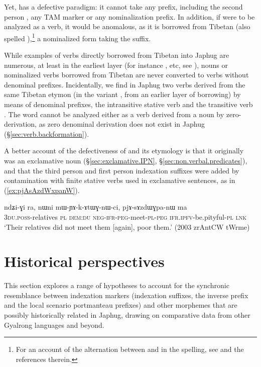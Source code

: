 Yet,  has a defective paradigm: it cannot take any prefix, including the second person , any TAM marker or any nominalization prefix. In addition, if  were to be analyzed as a verb, it would be anomalous, as it is borrowed from Tibetan  (also spelled  ),\footnote{For an account of the alternation between  and  in the spelling, see \citet{hill11hb} and the references therein.} a nominalized form taking the  suffix. 

While examples of verbs directly borrowed from Tibetan into Japhug are numerous, at least in the earliest layer (for instance ,  etc, see \citealt{jacques19contact}), nouns or nominalized verbs borrowed from Tibetan are never converted to verbs without denominal prefixes. Incidentally, we find in Japhug two verbs derived from the same Tibetan etymon (in the variant , from an earlier layer of borrowing) by means of denominal prefixes, the intransitive stative verb  and the transitive verb . The word  cannot be analyzed either as a verb derived from a noun by zero-derivation, as zero denominal derivation does not exist in Japhug (§\ref{sec:verb.backformation}).

A better account of the defectiveness of  and its etymology is that it originally was an exclamative noun (§\ref{sec:exclamative.IPN}, §\ref{sec:non.verbal.predicates}), and that the third person and first person indexation suffixes were added by contamination with finite stative verbs used in exclamative sentences, as  in  (\ref{ex:pjAsAzdWxpanW}).

\begin{exe}
\ex \label{ex:pjAsAzdWxpanW}
\gll ndʑi-ɣi ra, nɯni mɯ-ɲɤ-k-ɤtɯɣ-nɯ-ci, pjɤ-sɤzdɯɣpa-nɯ ma \\
\textsc{3du}.\textsc{poss}-relatives \textsc{pl} \textsc{dem}:\textsc{du} \textsc{neg}-\textsc{ifr}-\textsc{peg}-meet-\textsc{pl}-\textsc{peg} \textsc{ifr}.\textsc{ipfv}-be.pityful-\textsc{pl} \textsc{lnk} \\
\glt `Their relatives did not meet them [again], poor them.' (2003 zrAntCW tWrme)
\end{exe}

 
\section{Historical perspectives}
This section explores a range of hypotheses to account for the synchronic resemblance between indexation markers (indexation suffixes, the inverse prefix and the local scenario portmanteau prefixes) and other morphemes that are possibly historically related in Japhug, drawing on comparative data from other Gyalrong languages and beyond.
